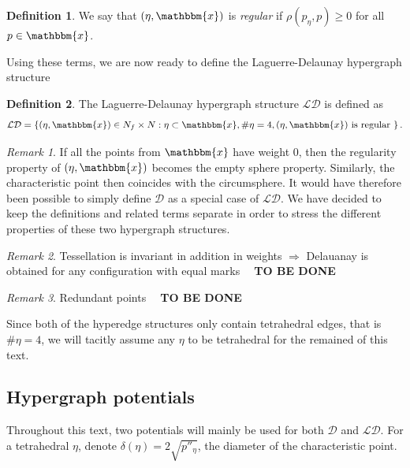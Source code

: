 \documentclass[12pt,a4paper]{article}
\theoremstyle{definition}
\newtheorem{definition}{Definition}
\theoremstyle{remark}
\newtheorem{remark}{Remark}
\theoremstyle{theorem}
\newcommand{\tbd}{\textbf{{\color{red}~ TO BE DONE ~}}}
\newcommand{\x}{\mathbbm{x}}
\begin{document}

\begin{definition}
We say that $(\eta,\x)$ is \textit{regular} if $\rho(p_\eta,p)\geq 0 $ for all $p \in \x$.
\end{definition}


Using these terms, we are now ready to define the Laguerre-Delaunay hypergraph structure

\begin{definition}
	The Laguerre-Delaunay hypergraph structure $\mathcal {LD}$ is defined as 
	$$\mathcal {LD} = \left\{ (\eta,\x) \in N_f \times N: \eta \subset \x, \# \eta = 4, (\eta,\x) \text{ is regular } \right\}.$$
\end{definition}

\begin{remark} If all the points from $\x$ have weight 0, then the regularity property of $(\eta, \x)$ becomes the empty sphere property. Similarly, the characteristic point then coincides with the circumsphere. It would have therefore been possible to simply define $\mathcal D$ as a special case of $\mathcal {LD}$. We have decided to keep the definitions and related terms separate in order to stress the different properties of these two hypergraph structures. 
\end{remark}


\begin{remark} \label{r:invariance} Tessellation is invariant in addition in weights $\Rightarrow$ Delauanay is obtained for any configuration with equal marks \tbd
\end{remark}

\begin{remark}
	Redundant points \tbd
\end{remark}

Since both of the hyperedge structures only contain tetrahedral edges, that is $\# \eta = 4$, we will tacitly assume any $\eta$ to be tetrahedral for the remained of this text. 



\subsection{Hypergraph potentials}
Throughout this text, two potentials will mainly be used for both $\mathcal D$ and $\mathcal {LD}$. For a tetrahedral $\eta$, denote $\delta(\eta)=2\sqrt{p''_\eta}$, the diameter of the characteristic point. 
\end{document}
